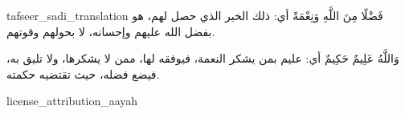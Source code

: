 \begin{taggedblock}{tafseer_sadi_translation}
{ فَضْلًا مِنَ اللَّهِ وَنِعْمَةً }
أي: ذلك الخير الذي حصل لهم، هو بفضل الله عليهم وإحسانه، لا بحولهم وقوتهم.

{ وَاللَّهُ عَلِيمٌ حَكِيمٌ }
أي: عليم بمن يشكر النعمة، فيوفقه لها، ممن لا يشكرها، ولا تليق به، فيضع فضله، حيث تقتضيه حكمته.
\end{taggedblock}
\begin{taggedblock}{license_attribution_aayah}

\end{taggedblock}
\begin{comment}
Please use the following for footnotes:- Sample\footnoteQ{Text of Qur'an footnote goes here.}.
Sample\footnoteT{Text of Tafseer footnote goes here.}.
\end{comment}